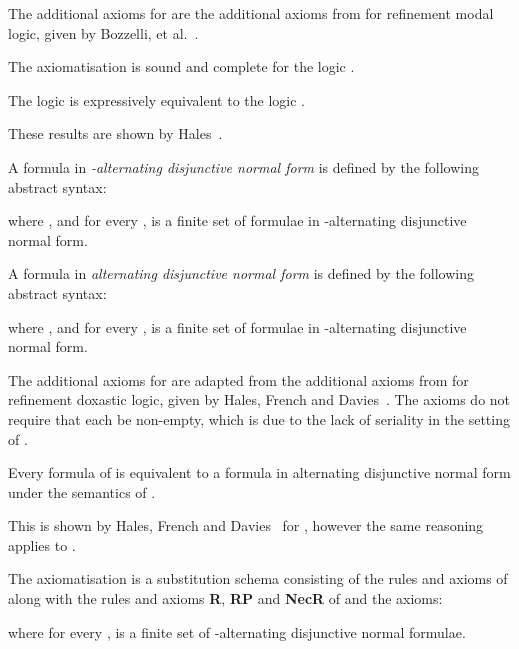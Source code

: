 \documentclass[twoside]{aiml14}
\begin{document}
  The additional axioms for \axiomAamlK{} are the additional axioms from \axiomRmlK{} for refinement modal logic, given by Bozzelli, et al.~\cite{bozzelli2012a}.

  \begin{proposition}
      The axiomatisation \axiomAamlK{} is sound and complete for the logic \logicAamlK{}.
  \end{proposition}

  \begin{proposition}
      The logic \logicAamlK{} is expressively equivalent to the logic \logicK{}.
  \end{proposition}

  These results are shown by Hales~\cite{hales2013}.

  \begin{definition}\label{adnf}
      A formula in {\em -alternating disjunctive normal form} is defined by the following abstract syntax:
      
      where ,  and for every ,
       is a finite set of formulae in -alternating disjunctive normal form.

      A formula in {\em alternating disjunctive normal form} is defined by the following abstract syntax:
      
      where ,  and for every ,
       is a finite set of formulae in -alternating disjunctive normal form.
  \end{definition}
  
  The additional axioms for \axiomAamlKFF{} are adapted from the additional
  axioms from \axiomRmlKD{} for refinement doxastic logic, given by Hales, French
  and Davies~\cite{hales2012}. The axioms do not require that each
   be non-empty, which is due to the lack of seriality in the
  setting of \classKFF{}.

  \begin{proposition}
      Every formula of \lang{} is equivalent to a formula in alternating
      disjunctive normal form under the semantics of \logicKFF{}.
  \end{proposition}

  This is shown by Hales, French and Davies~\cite{hales2012} for \logicKD{},
  however the same reasoning applies to \logicKFF{}.

  \begin{definition}
      The axiomatisation \axiomAmlKFF{} is a substitution schema consisting of
      the rules and axioms of \axiomAmlKFF{} along with the rules and axioms
      {\bf R}, {\bf RP} and {\bf NecR} of \axiomAamlK{} and the axioms:
      
      where for every ,  is a finite set
      of -alternating disjunctive normal formulae.
  \end{definition}
\end{document}
